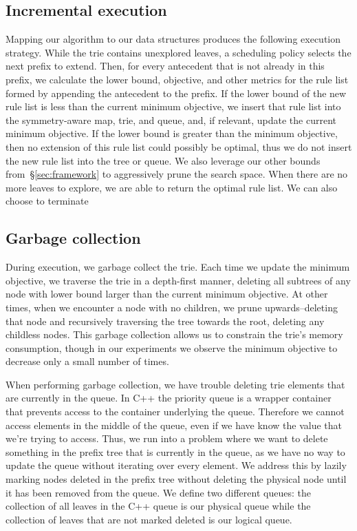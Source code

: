 \subsection{Incremental execution}
\label{sec:execution}

Mapping our algorithm to our data structures produces the following execution strategy.
%
While the trie contains unexplored leaves, a scheduling policy selects the next prefix to extend.
%
Then, for every antecedent that is not already in this prefix, we calculate the lower bound,
objective, and other metrics for the rule list formed by appending the antecedent to the prefix.
%
If the lower bound of the new rule list is less than the current minimum objective, we insert that
rule list into the symmetry-aware map, trie, and queue, and, if relevant, update the
current minimum objective.
%
If the lower bound is greater than the minimum objective,
then no extension of this rule list could possibly be optimal,
thus we do not insert the new rule list into the tree or queue.
%
We also leverage our other bounds from~\S\ref{sec:framework}
to aggressively prune the search space.
%
When there are no more leaves to explore, we are able to return the optimal rule list.
%
We can also choose to terminate

\subsection{Garbage collection}
\label{sec:gc}

During execution, we garbage collect the trie.
%
Each time we update the minimum objective,
we traverse the trie in a depth-first manner, deleting all subtrees
of any node with lower bound larger than the current minimum objective.
%
At other times, when we encounter a node with no children, we prune upwards--deleting that
node and recursively traversing the tree towards the root, deleting any childless nodes.
%
This garbage collection allows us to constrain the trie's memory consumption, though in our
experiments we observe the minimum objective to decrease only a
small number of times.

When performing garbage collection, we have trouble deleting trie elements that are currently in the queue.
In C++ the priority queue is a wrapper container that prevents access to the container underlying the queue.
Therefore we cannot access elements in the middle of the queue, even if we have know the value that we're trying to access.
Thus, we run into a problem where we want to delete something in the prefix tree that is currently in the queue, as we have no way to update the queue without iterating over every element.
We address this by lazily marking nodes deleted in the prefix tree without deleting the physical node until it has been removed from the queue.
We define two different queues: the collection of all leaves in the C++ queue is our physical queue while the collection of leaves that are not marked deleted is our logical queue.

